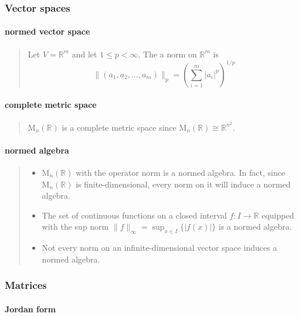 \documentclass[letterpaper, 10pt]{article}
\theoremstyle{theostyle}
\begin{document}
\subsubsection{Vector spaces}
\paragraph{normed vector space}
\begin{quote}
    Let \(V = \mathbb{R}^m\) and let \(1 \leq p < \infty\).
    The a norm on \(\mathbb{R}^m\) is
    \[\lVert (a_1, a_2, \dots, a_m) \rVert_p = \left(\sum_{i=1}^m \lvert a_i \rvert^p \right)^{1/p}\]
\end{quote}

\paragraph{complete metric space}
\begin{quote}
    \(\mathrm{M}_n(\mathbb{R})\) is a complete metric space since \(\mathrm{M}_n(\mathbb{R}) \cong \mathbb{R}^{n^2}\).
\end{quote}

\paragraph{normed algebra}
\begin{quote}
    \begin{itemize}
        \item \(\mathrm{M}_n(\mathbb{R})\) with the operator norm is a normed algebra.
        In fact, since \(\mathrm{M}_n(\mathbb{R})\) is finite-dimensional, every norm on it will induce a normed algebra.
        \item The set of continuous functions on a closed interval \(f: I \rightarrow \mathbb{R}\) equipped with the sup norm
        \(\displaystyle \lVert f \rVert_\infty = \sup_{x \in I} \{ \lvert f (x) \rvert\}\) is a normed algebra.
        \item Not every norm on an infinite-dimensional vector space induces a normed algebra.
    \end{itemize}
\end{quote}

\subsubsection{Matrices}
\paragraph{Jordan form}
\begin{quote}
\end{quote}
\end{document}
